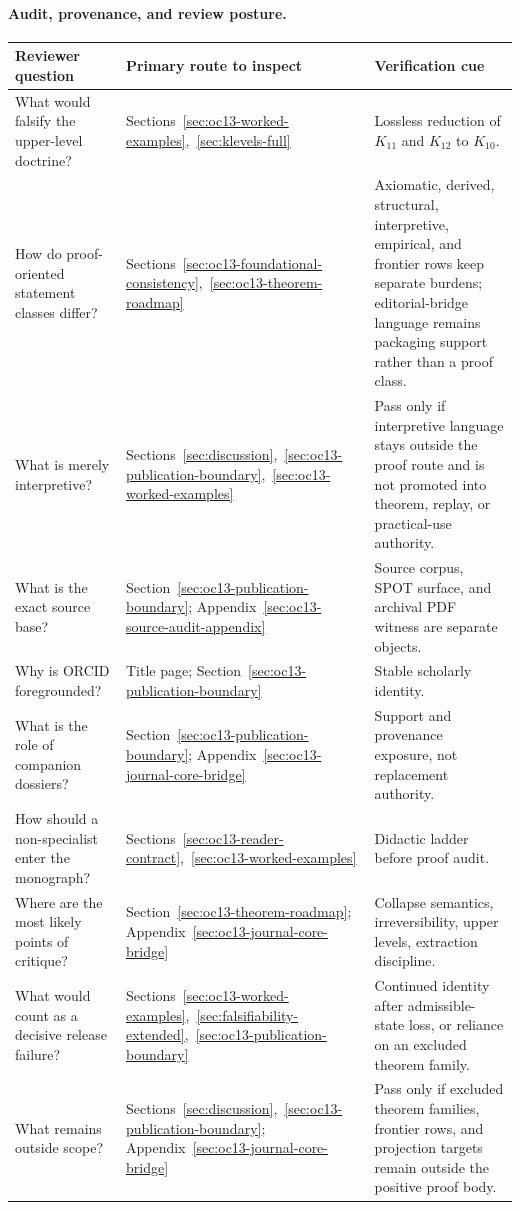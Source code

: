 \paragraph{Audit, provenance, and review posture.}
\par{\centering
\begin{tabular}{@{}L{0.18\textwidth}L{0.26\textwidth}L{0.46\textwidth}@{}}
\toprule
\textbf{Reviewer question} & \textbf{Primary route to inspect} & \textbf{Verification cue} \\
\midrule
What would falsify the upper-level doctrine? & Sections~\ref{sec:oc13-worked-examples},~\ref{sec:klevels-full} & Lossless reduction of \(K_{11}\) and \(K_{12}\) to \(K_{10}\). \\
How do proof-oriented statement classes differ? & Sections~\ref{sec:oc13-foundational-consistency},~\ref{sec:oc13-theorem-roadmap} & Axiomatic, derived, structural, interpretive, empirical, and frontier rows keep separate burdens; editorial-bridge language remains packaging support rather than a proof class. \\
What is merely interpretive? & Sections~\ref{sec:discussion},~\ref{sec:oc13-publication-boundary},~\ref{sec:oc13-worked-examples} & Pass only if interpretive language stays outside the proof route and is not promoted into theorem, replay, or practical-use authority. \\
What is the exact source base? & Section~\ref{sec:oc13-publication-boundary}; Appendix~\ref{sec:oc13-source-audit-appendix} & Source corpus, SPOT surface, and archival PDF witness are separate objects. \\
Why is ORCID foregrounded? & Title page; Section~\ref{sec:oc13-publication-boundary} & Stable scholarly identity. \\
What is the role of companion dossiers? & Section~\ref{sec:oc13-publication-boundary}; Appendix~\ref{sec:oc13-journal-core-bridge} & Support and provenance exposure, not replacement authority. \\
How should a non-specialist enter the monograph? & Sections~\ref{sec:oc13-reader-contract},~\ref{sec:oc13-worked-examples} & Didactic ladder before proof audit. \\
Where are the most likely points of critique? & Section~\ref{sec:oc13-theorem-roadmap}; Appendix~\ref{sec:oc13-journal-core-bridge} & Collapse semantics, irreversibility, upper levels, extraction discipline. \\
What would count as a decisive release failure? & Sections~\ref{sec:oc13-worked-examples},~\ref{sec:falsifiability-extended},~\ref{sec:oc13-publication-boundary} & Continued identity after admissible-state loss, or reliance on an excluded theorem family. \\
What remains outside scope? & Sections~\ref{sec:discussion},~\ref{sec:oc13-publication-boundary}; Appendix~\ref{sec:oc13-journal-core-bridge} & Pass only if excluded theorem families, frontier rows, and projection targets remain outside the positive proof body. \\
\bottomrule
\end{tabular}
\par}

